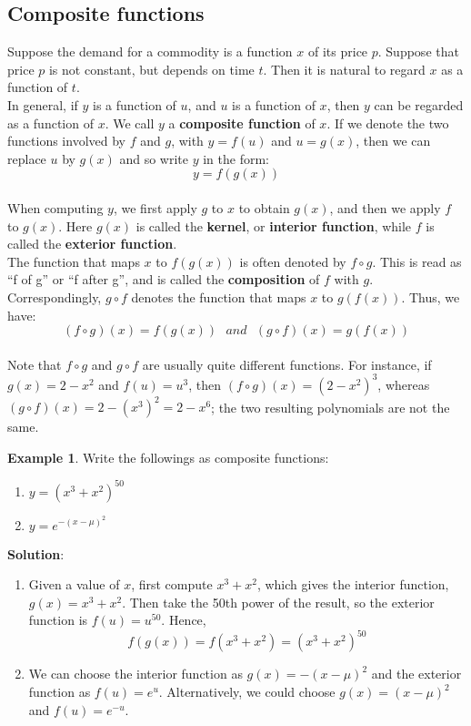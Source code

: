 \documentclass[10pt,a4paper]{book}
\theoremstyle{definition}\newtheorem{definition}{Definition}
\theoremstyle{definition}\newtheorem{fact}{Fact}
\theoremstyle{definition}\newtheorem{ex}{Ex.}
\theoremstyle{definition}\newtheorem{project}{Project}
\theoremstyle{definition}\newtheorem{problem}{Problem}
\theoremstyle{definition}\newtheorem{example}{Example}
\numberwithin{theorem}{chapter}
\numberwithin{corollary}{chapter}
\numberwithin{assumption}{chapter}
\numberwithin{definition}{chapter}
\numberwithin{prop}{chapter}
\numberwithin{notation}{chapter}
\numberwithin{problem}{chapter}
\numberwithin{example}{chapter}
\numberwithin{fact}{chapter}
\numberwithin{ex}{chapter}
\begin{document}
	\subsection{Composite functions}
	Suppose the demand for a commodity is a function $x$ of its price $p$. Suppose that price $p$ is not constant, but depends on time $t$. Then it is natural to regard $x$ as a function of $t$.
	\\
	In general, if $y$ is a function of $u$, and $u$ is a function of $x$, then $y$ can be regarded as a function of $x$. We call $y$ a \textbf{composite function} of $x$. If we denote the two functions involved by $f$ and $g$, with $y=f(u)$ and $u=g(x)$, then we can replace $u$ by $g(x)$ and so write $y$ in the form:
	$$y = f(g(x))$$
	\\
	When computing $y$, we first apply $g$ to $x$ to obtain $g(x)$, and then we apply $f$ to $g(x)$. Here $g(x)$ is called the \textbf{kernel}, or \textbf{interior function}, while $f$ is called the \textbf{exterior function}.
	\\
	The function that maps $x$ to $f(g(x))$ is often denoted by $f \circ g$. This is read as “f of g” or “f after g”, and is called the \textbf{composition} of $f$ with $g$. Correspondingly, $g \circ f$ denotes the function that maps $x$ to $g(f(x))$. Thus, we have:
	$$(f \circ g)(x) = f(g(x)) \,\,\,\,and\,\,\,\, (g \circ f)(x) = g(f(x))$$
	\\
	Note that $f \circ g$ and $g \circ f$ are usually quite different functions. For instance, if $g(x) = 2 - x^2$ and $f(u)=u^3$, then $(f \circ g)(x)=(2-x^2)^3$, whereas $(g \circ f)(x)=2-(x^3)^2 =2-x^6$; the two resulting polynomials are not the same.
	
	\begin{example}
		Write the followings as composite functions:
		\begin{enumerate}[label=(\alph*)]
			\item $y=(x^3+x^2)^{50}$
			\item $y=e^{-(x-\mu)^2}$
		\end{enumerate}
		\textbf{Solution}:
		\begin{enumerate}[label=(\alph*)]
			\item Given a value of $x$, first compute $x^3 + x^2$, which gives the interior function, $g(x) = x^3 + x^2$. Then take the 50th power of the result, so the exterior function is $f(u) = u^{50}$. Hence,
			$$f(g(x)) = f(x^3 + x^2) = (x^3 + x^2)^{50}$$
			\item We can choose the interior function as $g(x) = -(x - \mu)^2$ and the exterior function as $f(u) = e^{u}$. Alternatively, we could choose $g(x)=(x-\mu)^2$ and $f(u)=e^{-u}$.
		\end{enumerate}
	\end{example}
	
\end{document}
